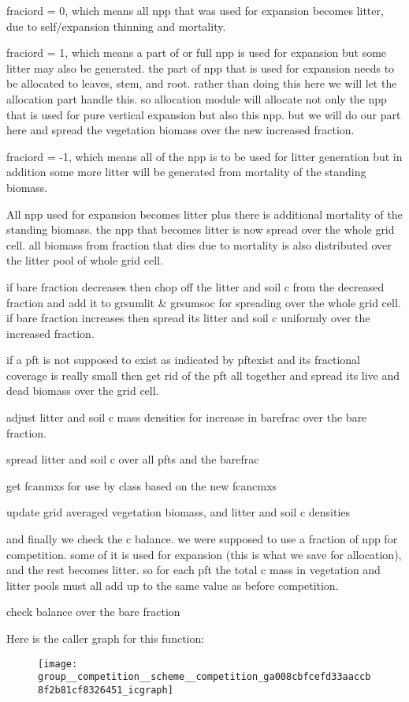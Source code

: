 \begin{DoxyEnumerate}
\item fraciord = 0, which means all npp that was used for expansion becomes litter, due to self/expansion thinning and mortality.
\item fraciord = 1, which means a part of or full npp is used for expansion but some litter may also be generated. the part of npp that is used for expansion needs to be allocated to leaves, stem, and root. rather than doing this here we will let the allocation part handle this. so allocation module will allocate not only the npp that is used for pure vertical expansion but also this npp. but we will do our part here and spread the vegetation biomass over the new increased fraction.
\item fraciord = -\/1, which means all of the npp is to be used for litter generation but in addition some more litter will be generated from mortality of the standing biomass.
\end{DoxyEnumerate}

All npp used for expansion becomes litter plus there is additional mortality of the standing biomass. the npp that becomes litter is now spread over the whole grid cell. all biomass from fraction that dies due to mortality is also distributed over the litter pool of whole grid cell.

if bare fraction decreases then chop off the litter and soil c from the decreased fraction and add it to grsumlit \& grsumsoc for spreading over the whole grid cell. if bare fraction increases then spread its litter and soil c uniformly over the increased fraction.

if a pft is not supposed to exist as indicated by pftexist and its fractional coverage is really small then get rid of the pft all together and spread its live and dead biomass over the grid cell.

adjust litter and soil c mass densities for increase in barefrac over the bare fraction.

spread litter and soil c over all pfts and the barefrac

get fcanmxs for use by class based on the new fcancmxs

update grid averaged vegetation biomass, and litter and soil c densities

and finally we check the c balance. we were supposed to use a fraction of npp for competition. some of it is used for expansion (this is what we save for allocation), and the rest becomes litter. so for each pft the total c mass in vegetation and litter pools must all add up to the same value as before competition.

check balance over the bare fraction 

Here is the caller graph for this function\+:\nopagebreak
\begin{figure}[H]
\begin{center}
\leavevmode
\texttt{[image: group\_\_competition\_\_scheme\_\_competition\_ga008cbfcefd33aaccb8f2b81cf8326451\_icgraph]}
\end{center}
\end{figure}


